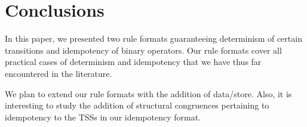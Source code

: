 \section{\label{sec::conc}Conclusions}
In this paper, we presented two rule formats  guaranteeing determinism of certain transitions and idempotency of binary operators.
Our rule formats cover all practical cases of determinism and idempotency that we have thus far encountered in the literature.

We plan to extend our rule formats with the addition of data/store.
Also, it is interesting to study the addition of structural congruences pertaining to idempotency
to the TSSs in our idempotency format.  